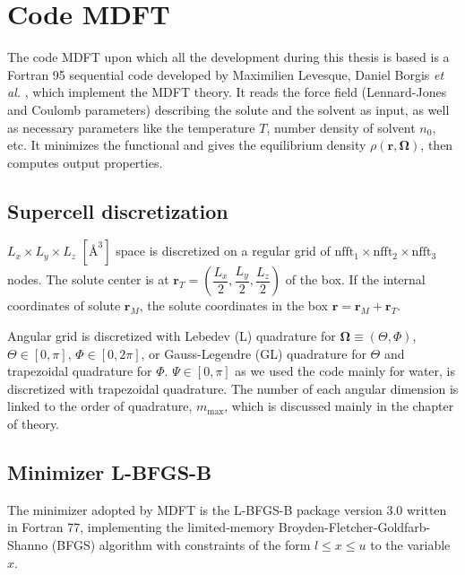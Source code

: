 
\chapter{Code MDFT\label{chpt:mdft}}

The code MDFT upon which all the development during this thesis is
based is a Fortran 95 sequential code developed by Maximilien Levesque,
Daniel Borgis \textit{et al.} \citep{gendre_classical_2009,jeanmairet_molecular_2013-1,jeanmairet_molecular_2015,jeanmairet_molecular_2016,Jeanmairet_thesis,levesque_solvation_2012,ramirez_density_2002,ramirez_density_2005,sergiievskyi_fast_2014,Zhao_2011},
which implement the \acs{MDFT} theory. It reads the force field (Lennard-Jones
and Coulomb parameters) describing the solute and the solvent as input,
as well as necessary parameters like the temperature $T$, number
density of solvent $n_{0}$, etc. It minimizes the functional and
gives the equilibrium density $\rho(\mathbf{r},\mathbf{\Omega})$,
then computes output properties.

\section{Supercell discretization}

$L_{x}\times L_{y}\times L_{z}$ $\left[\textrm{Å}^{3}\right]$ space
is discretized on a regular grid of $\textrm{nfft}_{1}\times\textrm{nfft}_{2}\times\textrm{nfft}_{3}$
nodes. The solute center is at $\mathbf{r}_{T}=\left(\dfrac{L_{x}}{2},\dfrac{L_{y}}{2},\dfrac{L_{z}}{2}\right)$
of the box. If the internal coordinates of solute $\mathbf{r}_{M}$,
the solute coordinates in the box $\mathbf{r}=\mathbf{r}_{M}+\mathbf{r}_{T}$.

Angular grid is discretized with Lebedev (L) quadrature for $\mathbf{\Omega}\equiv\left(\Theta,\Phi\right)$,
$\Theta\in\left[0,\pi\right]$, $\Phi\in\left[0,2\pi\right]$, or
Gauss-Legendre (GL) quadrature for $\Theta$ and trapezoidal quadrature
for $\Phi$. $\Psi\in\left[0,\pi\right]$ as we used the code mainly
for water, is discretized with trapezoidal quadrature. The number
of each angular dimension is linked to the order of quadrature, $m_{\max}$,
which is discussed mainly in the chapter of theory.

\section{Minimizer L-BFGS-B}

The minimizer adopted by \acs{MDFT} is the L-BFGS-B \citep{Zhu_1994_bfgs,Zhu_bfgs_1997_algorithm}
package version 3.0 written in Fortran 77, implementing the limited-memory
Broyden-Fletcher-Goldfarb-Shanno (BFGS) algorithm with constraints
of the form $l\leq x\leq u$ to the variable $x$.

